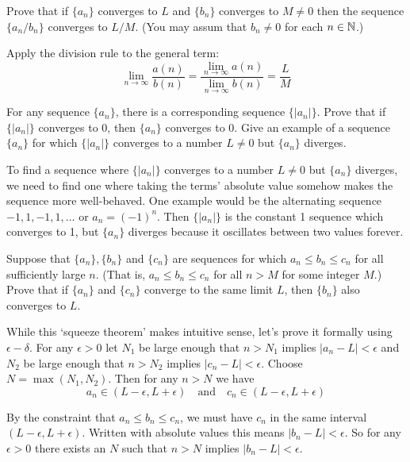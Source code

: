 \documentclass{article}
\begin{document}
\begin{problem}
Prove that if $\{a_n\}$ converges to $L$ and $\{b_n\}$ converges to $M\neq 0$ then the sequence $\{a_n / b_n\}$ converges to $L / M$. (You may assum that $b_n \neq 0$ for each $n \in \mathbb{N}$.)
\end{problem}

Apply the division rule to the general term:
$$\lim_{n\to\infty} \frac{a(n)}{b(n)} = \frac{\lim\limits_{n\to\infty} a(n)}{\lim\limits_{n\to\infty} b(n)} = \frac{L}{M}$$

\begin{problem}
For any sequence $\{a_n\}$, there is a corresponding sequence $\{|a_n|\}$. Prove that if $\{|a_n|\}$ converges to 0, then $\{a_n\}$ converges to 0. Give an example of a sequence $\{a_n\}$ for which $\{|a_n|\}$ converges to a number $L \neq 0$ but $\{a_n\}$ diverges.
\end{problem}

To find a sequence where $\{|a_n|\}$ converges to a number $L \neq 0$ but $\{a_n\}$ diverges, we need to find one where taking the terms' absolute value somehow makes the sequence more well-behaved. One example would be the alternating sequence $-1, 1, -1, 1, \ldots$ or $a_n = (-1)^n$. Then $\{|a_n|\}$ is the constant 1 sequence which converges to 1, but $\{a_n\}$ diverges because it oscillates between two values forever.

\begin{problem}
Suppose that $\{a_n\}, \{b_n\}$ and $\{c_n\}$ are sequences for which $a_n \leq b_n \leq c_n$ for all sufficiently large $n$. (That is, $a_n \leq b_n \leq c_n$ for all $n > M$ for some integer $M$.) Prove that if $\{a_n\}$ and $\{c_n\}$ converge to the same limit $L$, then $\{b_n\}$ also converges to $L$.
\end{problem}

While this `squeeze theorem' makes intuitive sense, let's prove it formally using $\epsilon-\delta$. For any $\epsilon > 0$ let $N_1$ be large enough that $n > N_1$ implies $|a_n - L| < \epsilon$ and $N_2$ be large enough that $n > N_2$ implies $|c_n - L| < \epsilon$. Choose $N = \max(N_1, N_2)$. Then for any $n > N$ we have
$$a_n \in (L - \epsilon, L + \epsilon) \quad \text{and} \quad c_n \in (L - \epsilon, L + \epsilon)$$

By the constraint that $a_n \leq b_n \leq c_n$, we must have $c_n$ in the same interval $(L - \epsilon, L + \epsilon)$. Written with absolute values this means $|b_n - L| < \epsilon$. So for any $\epsilon > 0$ there exists an $N$ such that $n > N$ implies $|b_n - L| < \epsilon$.
\end{document}
